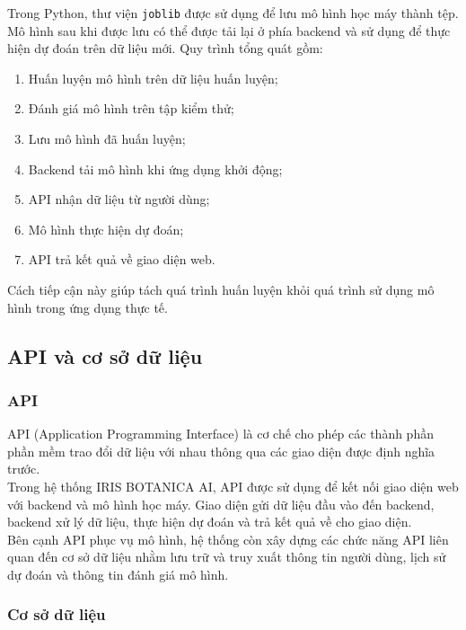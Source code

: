 \documentclass[14pt]{extarticle}
\begin{document}
						\noindent Trong Python, thư viện \texttt{joblib} được sử dụng để lưu mô hình học máy thành tệp. Mô hình sau khi được lưu có thể được tải lại ở phía backend và sử dụng để thực hiện dự đoán trên dữ liệu mới.
						\newpage
						\noindent Quy trình tổng quát gồm:
						
						\begin{enumerate}
							\item Huấn luyện mô hình trên dữ liệu huấn luyện;
							\item Đánh giá mô hình trên tập kiểm thử;
							\item Lưu mô hình đã huấn luyện;
							\item Backend tải mô hình khi ứng dụng khởi động;
							\item API nhận dữ liệu từ người dùng;
							\item Mô hình thực hiện dự đoán;
							\item API trả kết quả về giao diện web.
						\end{enumerate}
						
						\noindent Cách tiếp cận này giúp tách quá trình huấn luyện khỏi quá trình sử dụng mô hình trong ứng dụng thực tế.
						\subsection{API và cơ sở dữ liệu}
						
						\subsubsection{API}
						
							\noindent API (Application Programming Interface) là cơ chế cho phép các thành phần phần mềm trao đổi dữ liệu với nhau thông qua các giao diện được định nghĩa trước.\\
						
							\noindent Trong hệ thống IRIS BOTANICA AI, API được sử dụng để kết nối giao diện web với backend và mô hình học máy. Giao diện gửi dữ liệu đầu vào đến backend,	backend xử lý dữ liệu, thực hiện dự đoán và trả kết quả về cho giao diện.\\
						
							\noindent Bên cạnh API phục vụ mô hình, hệ thống còn xây dựng các chức năng API liên quan đến cơ sở dữ liệu nhằm lưu trữ và truy xuất thông tin người dùng, lịch sử dự đoán và thông tin đánh giá mô hình.\\
						
						\subsubsection{Cơ sở dữ liệu}
						
\end{document}
